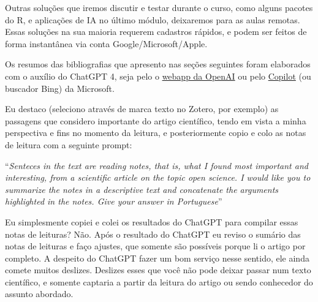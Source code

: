 \documentclass[
  a4paper,
]{article}
\begin{document}
Outras soluções que iremos discutir e testar durante o curso, como
alguns pacotes do R, e aplicações de IA no último módulo, deixaremos
para as aulas remotas. Essas soluções na sua maioria requerem cadastros
rápidos, e podem ser feitos de forma instantânea via conta
Google/Microsoft/Apple.

\begin{tcolorbox}[enhanced jigsaw, leftrule=.75mm, left=2mm, toprule=.15mm, opacitybacktitle=0.6, colback=white, titlerule=0mm, colbacktitle=quarto-callout-important-color!10!white, bottomtitle=1mm, bottomrule=.15mm, opacityback=0, rightrule=.15mm, toptitle=1mm, title=\textcolor{quarto-callout-important-color}{\faExclamation}\hspace{0.5em}{ChatGPT para suas notas de leituras}, colframe=quarto-callout-important-color-frame, arc=.35mm, breakable, coltitle=black]

Os resumos das bibliografias que apresento nas seções seguintes foram
elaborados com o auxílio do ChatGPT 4, seja pelo o
\href{https://chat.openai.com/}{webapp da OpenAI} ou pelo
\href{https://copilot.microsoft.com/}{Copilot} (ou buscador Bing) da
Microsoft.

Eu destaco (seleciono através de marca texto no Zotero, por exemplo) as
passagens que considero importante do artigo científico, tendo em vista
a minha perspectiva e fins no momento da leitura, e posteriormente copio
e colo as notas de leitura com a seguinte prompt:

``\emph{Senteces in the text are reading notes, that is, what I found
most important and interesting, from a scientific article on the topic
open science. I would like you to summarize the notes in a descriptive
text and concatenate the arguments highlighted in the notes. Give your
answer in Portuguese}''

\end{tcolorbox}

\begin{tcolorbox}[enhanced jigsaw, leftrule=.75mm, left=2mm, toprule=.15mm, opacitybacktitle=0.6, colback=white, titlerule=0mm, colbacktitle=quarto-callout-caution-color!10!white, bottomtitle=1mm, bottomrule=.15mm, opacityback=0, rightrule=.15mm, toptitle=1mm, title=\textcolor{quarto-callout-caution-color}{\faFire}\hspace{0.5em}{Não confie cegamente na IA}, colframe=quarto-callout-caution-color-frame, arc=.35mm, breakable, coltitle=black]

Eu simplesmente copiei e colei os resultados do ChatGPT para compilar
essas notas de leituras? Não. Após o resultado do ChatGPT eu reviso o
sumário das notas de leituras e faço ajustes, que somente são possíveis
porque li o artigo por completo. A despeito do ChatGPT fazer um bom
serviço nesse sentido, ele ainda comete muitos deslizes. Deslizes esses
que você não pode deixar passar num texto científico, e somente captaria
a partir da leitura do artigo ou sendo conhecedor do assunto abordado.

\end{tcolorbox}
\end{document}
